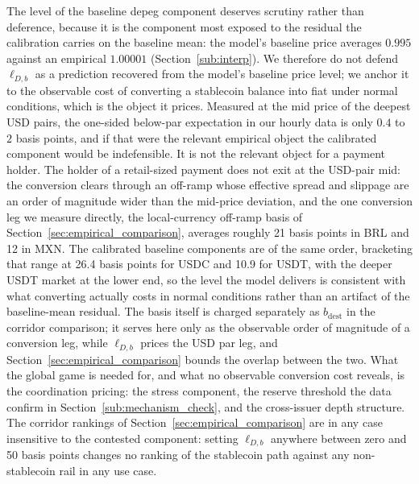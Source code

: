 The level of the baseline depeg component deserves scrutiny rather than deference, because it is the component most exposed to the residual the calibration carries on the baseline mean: the model's baseline price averages $0.995$ against an empirical $1.00001$ (Section~\ref{sub:interp}). We therefore do not defend $\ell_{D,b}$ as a prediction recovered from the model's baseline price level; we anchor it to the observable cost of converting a stablecoin balance into fiat under normal conditions, which is the object it prices. Measured at the mid price of the deepest USD pairs, the one-sided below-par expectation in our hourly data is only $0.4$ to $2$ basis points, and if that were the relevant empirical object the calibrated component would be indefensible. It is not the relevant object for a payment holder. The holder of a retail-sized payment does not exit at the USD-pair mid: the conversion clears through an off-ramp whose effective spread and slippage are an order of magnitude wider than the mid-price deviation, and the one conversion leg we measure directly, the local-currency off-ramp basis of Section~\ref{sec:empirical_comparison}, averages roughly 21 basis points in BRL and 12 in MXN. The calibrated baseline components are of the same order, bracketing that range at 26.4 basis points for USDC and 10.9 for USDT, with the deeper USDT market at the lower end, so the level the model delivers is consistent with what converting actually costs in normal conditions rather than an artifact of the baseline-mean residual. The basis itself is charged separately as $b_{\text{dest}}$ in the corridor comparison; it serves here only as the observable order of magnitude of a conversion leg, while $\ell_{D,b}$ prices the USD par leg, and Section~\ref{sec:empirical_comparison} bounds the overlap between the two. What the global game is needed for, and what no observable conversion cost reveals, is the coordination pricing: the stress component, the reserve threshold the data confirm in Section~\ref{sub:mechanism_check}, and the cross-issuer depth structure. The corridor rankings of Section~\ref{sec:empirical_comparison} are in any case insensitive to the contested component: setting $\ell_{D,b}$ anywhere between zero and 50 basis points changes no ranking of the stablecoin path against any non-stablecoin rail in any use case.

